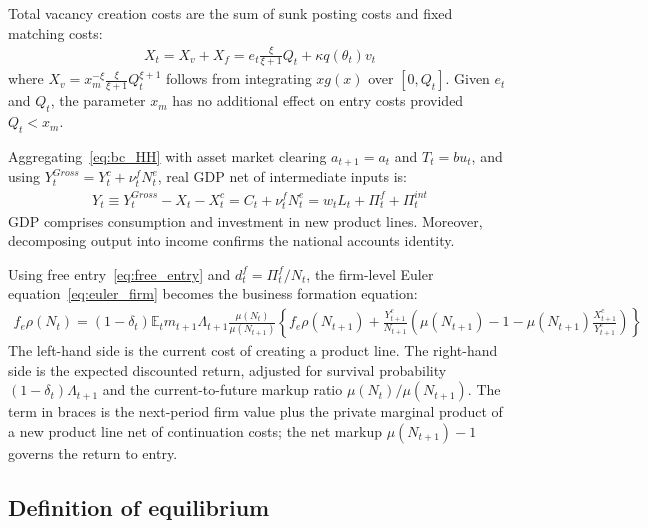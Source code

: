 \documentclass[authoryear, review, 12pt]{elsarticle}
\begin{document}
	Total vacancy creation costs are the sum of sunk posting 
	costs and fixed matching costs:
	\begin{align}\label{eq:X_total}
		X_t = X_v + X_f 
		= e_t\frac{\xi}{\xi+1}Q_t + \kappa q(\theta_t)v_t
	\end{align}
	where $X_v = x_m^{-\xi}\frac{\xi}{\xi+1}Q_t^{\xi+1}$ 
	follows from integrating $xg(x)$ over $[0,Q_t]$. Given 
	$e_t$ and $Q_t$, the parameter $x_m$ has no additional 
	effect on entry costs provided $Q_t < x_m$.
	
	Aggregating~\eqref{eq:bc_HH} with asset market clearing 
	$a_{t+1}=a_t$ and $T_t=bu_t$, and using 
	$Y_t^{Gross} = Y_t^c + \nu_t^f N_t^e$, real GDP net 
	of intermediate inputs is:
	\begin{align}\label{eq:gdp}
		Y_t \equiv Y_t^{Gross} - X_t - X_t^c 
		= C_t + \nu_t^f N_t^e 
		= w_tL_t + \Pi_t^f + \Pi_t^{int}
	\end{align}
	GDP comprises consumption and investment in new product 
	lines. Moreover, decomposing output into income confirms the national 
	accounts identity.
	
	Using free entry~\eqref{eq:free_entry} and $d_t^f = 
	\Pi_t^f/N_t$, the firm-level Euler 
	equation~\eqref{eq:euler_firm} becomes the business 
	formation equation:
	\begin{align}\label{eq:euler_bf}
		f_e\rho(N_t) = (1-\delta_t)\mathbb{E}_t m_{t+1}
		\Lambda_{t+1}\frac{\mu(N_t)}{\mu(N_{t+1})}
		\left\{f_e\rho(N_{t+1}) + \frac{Y_{t+1}^c}{N_{t+1}}
		\left(\mu(N_{t+1})-1-\mu(N_{t+1})
		\frac{X_{t+1}^c}{Y_{t+1}^c}\right)\right\}
	\end{align}
	The left-hand side is the current cost of creating a 
	product line. The right-hand side is the expected 
	discounted return, adjusted for survival probability 
	$(1-\delta_t)\Lambda_{t+1}$ and the current-to-future 
	markup ratio $\mu(N_t)/\mu(N_{t+1})$. The term in 
	braces is the next-period firm value plus the private 
	marginal product of a new product line net of 
	continuation costs; the net markup $\mu(N_{t+1})-1$ 
	governs the return to entry.
	
	\subsection{Definition of equilibrium}\label{sec:def_eq}
	
\end{document}
